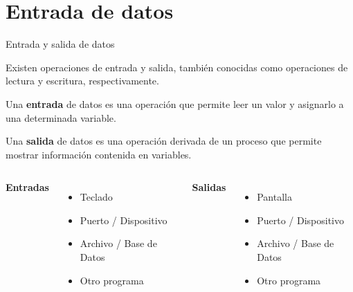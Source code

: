 
\section{Entrada de datos}

\begin{frame}[c]{Entrada y salida de datos}

  \vspace{\baselineskip}
  Existen operaciones de entrada y salida, también conocidas como
  operaciones de lectura y escritura, respectivamente.

  \vspace{\baselineskip}
  Una \textbf{entrada} de datos es una operación que permite leer
  un valor y asignarlo a una determinada variable.

  \vspace{\baselineskip}
  Una \textbf{salida} de datos es una operación derivada de un
  proceso que permite mostrar información contenida en variables.

  \pausa
  \vspace{\baselineskip}
  \begin{columns}
      \textbf{Entradas}
      \begin{itemize}
        \item Teclado
        \item Puerto / Dispositivo
        \item Archivo / Base de Datos
        \item Otro programa
      \end{itemize}
      \textbf{Salidas}
      \begin{itemize}
        \item Pantalla
        \item Puerto / Dispositivo
        \item Archivo / Base de Datos
        \item Otro programa
      \end{itemize}
  \end{columns}
\end{frame}

